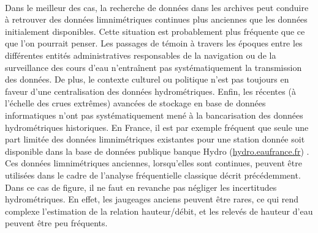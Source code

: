 	\paragraph{} Dans le meilleur des cas, la recherche de données dans les archives peut conduire à retrouver des données limnimétriques continues plus anciennes que les données initialement disponibles. Cette situation est probablement plus fréquente que ce que l'on pourrait penser. Les passages de témoin à travers les époques entre les différentes entités administratives responsables de la navigation ou de la surveillance des cours d'eau n'entraînent pas systématiquement la transmission des données. De plus, le contexte culturel ou politique n'est pas toujours en faveur d'une centralisation des données hydrométriques. Enfin, les récentes (à l'échelle des crues extrêmes) avancées de stockage en base de données informatiques n'ont pas systématiquement mené à la bancarisation des données hydrométriques historiques. En France, il est par exemple fréquent que seule une part limitée des données limnimétriques existantes pour une station donnée soit disponible dans la base de données publique banque Hydro (\url{hydro.eaufrance.fr}) \citep{le_gros_les_2015}. Ces données limnimétriques anciennes, lorsqu'elles sont continues, peuvent être utilisées dans le cadre de l'analyse fréquentielle classique décrit précédemment. Dans ce cas de figure, il ne faut en revanche pas négliger les incertitudes hydrométriques. En effet, les jaugeages anciens peuvent être rares, ce qui rend complexe l'estimation de la relation hauteur/débit, et les relevés de hauteur d'eau peuvent être peu fréquents.
	

